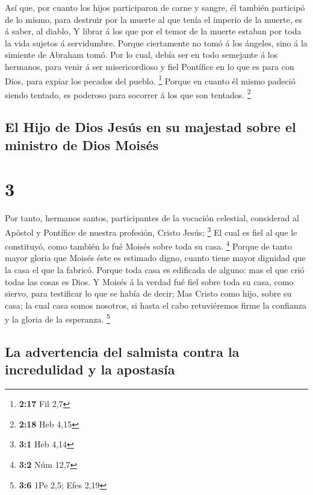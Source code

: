  Así que, por cuanto los hijos participaron de carne y
sangre, él también participó de lo mismo, para destruir por la muerte al
que tenía el imperio de la muerte, es á saber, al diablo,
 Y librar á los que por el temor de la muerte estaban por
toda la vida sujetos á servidumbre.  Porque ciertamente
no tomó á los ángeles, sino á la simiente de Abraham tomó.
 Por lo cual, debía ser en todo semejante á los hermanos,
para venir á ser misericordioso y fiel Pontífice en lo que es para con
Dios, para expiar los pecados del pueblo. \footnote{\textbf{2:17} Fil
  2,7}  Porque en cuanto él mismo padeció siendo tentado,
es poderoso para socorrer á los que son tentados. \footnote{\textbf{2:18}
  Heb 4,15}

\hypertarget{el-hijo-de-dios-jesuxfas-en-su-majestad-sobre-el-ministro-de-dios-moisuxe9s}{%
\subsection{El Hijo de Dios Jesús en su majestad sobre el ministro de
Dios
Moisés}\label{el-hijo-de-dios-jesuxfas-en-su-majestad-sobre-el-ministro-de-dios-moisuxe9s}}

\hypertarget{section-2}{%
\section{3}\label{section-2}}

 Por tanto, hermanos santos, participantes de la vocación
celestial, considerad al Apóstol y Pontífice de nuestra profesión,
Cristo Jesús; \footnote{\textbf{3:1} Heb 4,14}  El cual es
fiel al que le constituyó, como también lo fué Moisés sobre toda su
casa. \footnote{\textbf{3:2} Núm 12,7}  Porque de tanto
mayor gloria que Moisés éste es estimado digno, cuanto tiene mayor
dignidad que la casa el que la fabricó.  Porque toda casa
es edificada de alguno: mas el que crió todas las cosas es Dios.
 Y Moisés á la verdad fué fiel sobre toda su casa, como
siervo, para testificar lo que se había de decir;  Mas
Cristo como hijo, sobre su casa; la cual casa somos nosotros, si hasta
el cabo retuviéremos firme la confianza y la gloria de la esperanza.
\footnote{\textbf{3:6} 1Pe 2,5; Efes 2,19}

\hypertarget{la-advertencia-del-salmista-contra-la-incredulidad-y-la-apostasuxeda}{%
\subsection{La advertencia del salmista contra la incredulidad y la
apostasía}\label{la-advertencia-del-salmista-contra-la-incredulidad-y-la-apostasuxeda}}

